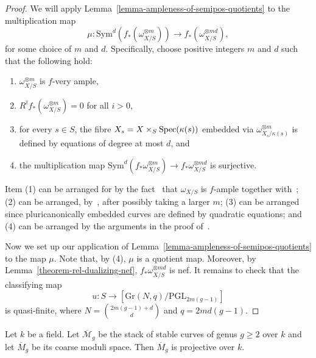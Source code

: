 \begin{proof}
We will apply Lemma~\ref{lemma-ampleness-of-semipos-quotients} to the
multiplication map
$$
\mu : \mathrm{Sym}^d(f_*(\omega_{X/S}^{\otimes m})) \to f_*(\omega_{X/S}^{\otimes md}),
$$
for some choice of $m$ and $d$.
Specifically, choose positive integers $m$ and $d$ such that the following
hold:
\begin{enumerate}
\item $\omega_{X/S}^{\otimes m}$ is $f$-very ample,
\item $R^if_*(\omega_{X/S}^{\otimes m}) = 0$ for all $i > 0$,
\item for every $s \in S$, the fibre $X_s = X \times_S \mathop{\rm Spec}(\kappa(s))$
  embedded via $\omega_{X_s/\kappa(s)}^{\otimes m}$ is defined by equations
  of degree at most $d$, and
\item the multiplication map
  $\mathrm{Sym}^d(f_*\omega_{X/S}^{\otimes m}) \to f_*\omega_{X/S}^{\otimes md}$
  is surjective.
\end{enumerate}
Item (1) can be arranged for by the fact~\cite[Corollary of (1.2)]{dm} that
$\omega_{X/S}$ is $f$-ample together with~;
(2) can be arranged, by~, after possibly taking a larger $m$;
(3) can be arranged since pluricanonically embedded curves are defined
by quadratic equations; and
(4) can be arranged by the arguments in the proof of~.

Now we set up our application of Lemma~\ref{lemma-ampleness-of-semipos-quotients}
to the map $\mu$.
Note that, by (4), $\mu$ is a quotient map.
Moreover, by Lemma~\ref{theorem-rel-dualizing-nef},
$f_*\omega_{X/S}^{\otimes md}$ is nef.
It remains to check that the classifying map
$$
u : S \to [\mathrm{Gr}(N,q)/\mathrm{PGL}_{2m(g - 1)}]
$$
is quasi-finite, where $N = \binom{2m(g - 1) + d}{d}$ and $q = 2md(g - 1)$.
\end{proof}

\begin{lemma}
\label{lemma-mgbar-proj-field}
Let $k$ be a field.
Let $\overline{\mathcal{M}}_g$ be the stack of stable curves of genus $g \geq 2$
over $k$ and let $\overline{M}_g$ be its coarse moduli space.
Then $\overline{M}_g$ is projective over $k$.
\end{lemma}

